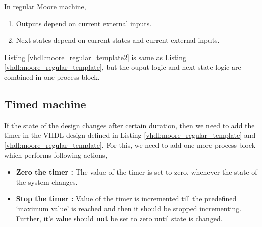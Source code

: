 \begin{noNumBox}
	In regular Moore machine, 
	\begin{enumerate}
		\item Outputs depend on current external inputs. 
		\item Next states depend on current states and current external inputs.
	\end{enumerate}
\end{noNumBox}



Listing \ref{vhdl:moore_regular_template2} is same as Listing \ref{vhdl:moore_regular_template}, but the ouput-logic and next-state logic are combined in one process block. 



\subsection{Timed machine}
If the state of the design changes after certain duration, then we need to add the timer in the VHDL design defined in Listing \ref{vhdl:moore_regular_template} and \ref{vhdl:moore_regular_template}. For this, we need to add one more process-block which performs following actions, 
\begin{itemize}
	\item \textbf{Zero the timer : } The value of the timer is set to zero, whenever the state of the system changes. 
	\item \textbf{Stop the timer : } Value of the timer is incremented till the predefined `maximum value' is reached and then it should be stopped incrementing. Further, it's value should \textbf{not} be set to zero until state is changed. 
\end{itemize}

